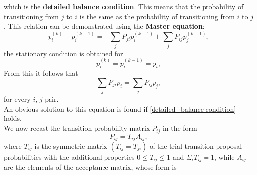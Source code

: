 which is the \textbf{detailed balance condition}. This means that the probability of transitioning from $j$ to $i$ is the same as 
the probability of transitioning from $i$ to $j$. This relation can be demonstrated using the \textbf{Master equation}:
\begin{equation}
    p_i^{(k)}-p_{i}^{(k-1)}=-\sum_{j}P_{ji}p_{i}^{(k-1)}+\sum_{j}P_{ij}p_{j}^{(k-1)},
    \label{master_equation}
\end{equation}
the stationary condition is obtained for
\begin{equation}
    p_i^{(k)}=p_{i}^{(k-1)}=p_i,
\end{equation}
From this it follows that 
\begin{equation}
    \sum_jP_{ji}p_i=\sum_jP_{ij}p_j,
\end{equation}
for every $i$, $j$ pair.\\
An obvious solution to this equation is found if \ref{detailed_balance condition} holds.\\
We now recast the transition probability matrix $P_{ij}$ in the form
\begin{equation}
    P_{ij}=T_{ij}A_{ij},
\end{equation}
where $T_{ij}$ is the symmetric matrix $(T_{ij}=T_{ji})$ of the trial transition proposal probabilities with the additional properties 
$0\le T_{ij}\le 1$ and $\Sigma_i T_{ij}=1$, while $A_{ij}$ are the elements of the acceptance matrix, whose form is 

